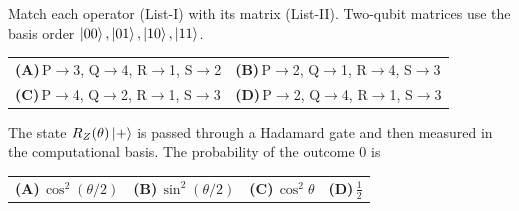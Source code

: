 \documentclass[11pt,a4paper]{article}
\newcommand{\optlabel}[1]{\textbf{(#1)}}
\newenvironment{qitem}[1]{\begin{list}{}{\setlength{\leftmargin}{3.3em}\setlength{\labelwidth}{3.1em}%
  \setlength{\labelsep}{0.2em}\setlength{\topsep}{3pt}\setlength{\parsep}{3pt}}\item[\textbf{Q.#1}\hfill]}{\end{list}}
\newcommand{\qsep}{\par\vspace{2pt}{\color{black!15}\hrule}\vspace{4pt}}
\begin{document}
\begin{qitem}{23}
Match each operator (List-I) with its matrix (List-II). Two-qubit matrices use the basis order $\ket{00}, \ket{01},
\ket{10}, \ket{11}$.
\par\smallskip{}
\par\smallskip\noindent\begin{tabularx}{\linewidth}{@{}*{2}{L}@{}}
\optlabel{A}\,P$\to$3, Q$\to$4, R$\to$1, S$\to$2 & \optlabel{B}\,P$\to$2, Q$\to$1, R$\to$4, S$\to$3 \\[3pt]
\optlabel{C}\,P$\to$4, Q$\to$2, R$\to$1, S$\to$3 & \optlabel{D}\,P$\to$2, Q$\to$4, R$\to$1, S$\to$3
\end{tabularx}
\end{qitem}
\qsep

\begin{qitem}{24}
The state $R_Z(\theta)\ket{+}$ is passed through a Hadamard gate and then measured in the computational basis. The
probability of the outcome 0 is
\par\smallskip\noindent\begin{tabularx}{\linewidth}{@{}*{4}{L}@{}}
\optlabel{A}\,$\cos^2(\theta/2)$ & \optlabel{B}\,$\sin^2(\theta/2)$ & \optlabel{C}\,$\cos^2\theta$ & \optlabel{D}\,$\tfrac12$
\end{tabularx}
\end{qitem}
\qsep
\end{document}

